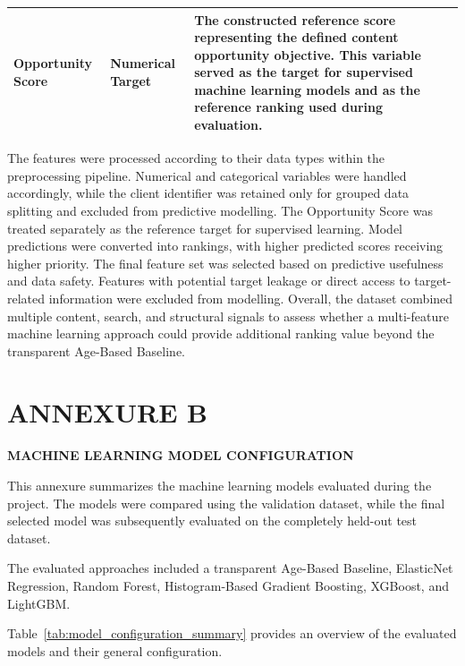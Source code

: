 \documentclass[12pt,a4paper]{report}
\begin{document}
\begin{table}[htbp]
{\begin{tabular}{|p{3.5cm}|p{3cm}|p{8cm}|}
Opportunity Score &
Numerical Target &
The constructed reference score representing the defined content opportunity objective. This variable served as the target for supervised machine learning models and as the reference ranking used during evaluation. \\
\hline

\end{tabular}
}
\end{table}

The features were processed according to their data types within the preprocessing pipeline. Numerical and categorical variables were handled accordingly, while the client identifier was retained only for grouped data splitting and excluded from predictive modelling. The Opportunity Score was treated separately as the reference target for supervised learning. Model predictions were converted into rankings, with higher predicted scores receiving higher priority. The final feature set was selected based on predictive usefulness and data safety. Features with potential target leakage or direct access to target-related information were excluded from modelling. Overall, the dataset combined multiple content, search, and structural signals to assess whether a multi-feature machine learning approach could provide additional ranking value beyond the transparent Age-Based Baseline.

\chapter*{ANNEXURE B}


\begin{center}
    \textbf{\Large MACHINE LEARNING MODEL CONFIGURATION}
\end{center}

\vspace{0.5cm}

This annexure summarizes the machine learning models evaluated during the project. The models were compared using the validation dataset, while the final selected model was subsequently evaluated on the completely held-out test dataset.

The evaluated approaches included a transparent Age-Based Baseline, ElasticNet Regression, Random Forest, Histogram-Based Gradient Boosting, XGBoost, and LightGBM.

Table~\ref{tab:model_configuration_summary} provides an overview of the evaluated models and their general configuration.
\end{document}
